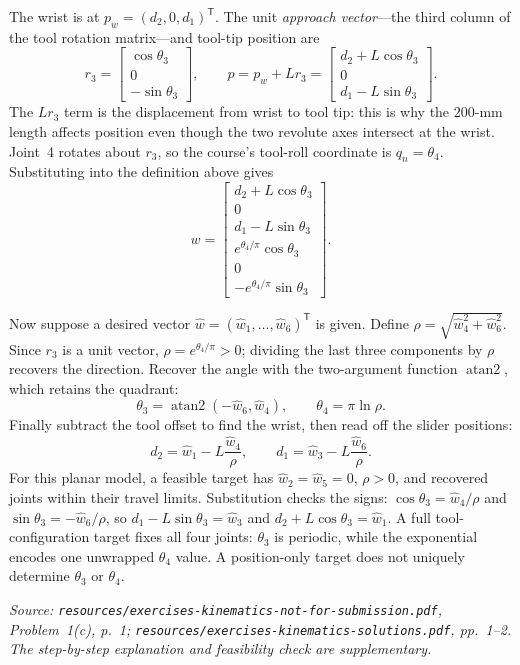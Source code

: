 \documentclass[11pt,a4paper]{article}
\renewcommand{\texttt}[1]{\nolinkurl{#1}}
\newcommand{\trans}{\mathsf{T}}
\newcommand{\source}[1]{\par\smallskip\noindent\textit{Source: #1.}\par\smallskip}
\begin{document}
The wrist is at $p_w=(d_2,0,d_1)^\trans$. The unit \emph{approach vector}---the third column of the tool rotation matrix---and tool-tip position are
\[
 r_3=\begin{bmatrix}\cos\theta_3\\0\\-\sin\theta_3\end{bmatrix},\qquad
 p=p_w+Lr_3=\begin{bmatrix}d_2+L\cos\theta_3\\0\\d_1-L\sin\theta_3\end{bmatrix}.
\]
The $Lr_3$ term is the displacement from wrist to tool tip: this is why the $200$-mm length affects position even though the two revolute axes intersect at the wrist. Joint~4 rotates about $r_3$, so the course's tool-roll coordinate is $q_n=\theta_4$. Substituting into the definition above gives
\[
 w=\begin{bmatrix}
 d_2+L\cos\theta_3\\0\\d_1-L\sin\theta_3\\
 e^{\theta_4/\pi}\cos\theta_3\\0\\-e^{\theta_4/\pi}\sin\theta_3
 \end{bmatrix}.
\]

Now suppose a desired vector $\widehat w=(\widehat w_1,\ldots,\widehat w_6)^\trans$ is given. Define $\rho=\sqrt{\widehat w_4^2+\widehat w_6^2}$. Since $r_3$ is a unit vector, $\rho=e^{\theta_4/\pi}>0$; dividing the last three components by $\rho$ recovers the direction. Recover the angle with the two-argument function $\operatorname{atan2}$, which retains the quadrant:
\[
 \theta_3=\operatorname{atan2}(-\widehat w_6,\widehat w_4),\qquad
 \theta_4=\pi\ln\rho.
\]
Finally subtract the tool offset to find the wrist, then read off the slider positions:
\[
 d_2=\widehat w_1-L\frac{\widehat w_4}{\rho},\qquad
 d_1=\widehat w_3-L\frac{\widehat w_6}{\rho}.
\]
For this planar model, a feasible target has $\widehat w_2=\widehat w_5=0$, $\rho>0$, and recovered joints within their travel limits. Substitution checks the signs: $\cos\theta_3=\widehat w_4/\rho$ and $\sin\theta_3=-\widehat w_6/\rho$, so $d_1-L\sin\theta_3=\widehat w_3$ and $d_2+L\cos\theta_3=\widehat w_1$. A full tool-configuration target fixes all four joints: $\theta_3$ is periodic, while the exponential encodes one unwrapped $\theta_4$ value. A position-only target does not uniquely determine $\theta_3$ or $\theta_4$.
\source{\texttt{resources/exercises-kinematics-not-for-submission.pdf}, Problem~1(c), p.~1; \texttt{resources/exercises-kinematics-solutions.pdf}, pp.~1--2. The step-by-step explanation and feasibility check are supplementary}
\end{document}
